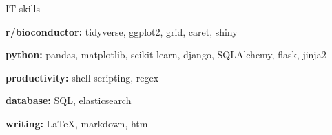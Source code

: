 

\begin{cvskills}
  \cvskill
    {IT skills} %
    {
      \begin{cvitems}
        \item {\textbf{r/bioconductor:} tidyverse, ggplot2, grid, caret, shiny}
        \item {\textbf{python:} pandas, matplotlib, scikit-learn, django, SQLAlchemy, flask, jinja2}
        \item {\textbf{productivity:} shell scripting, regex}
        \item {\textbf{database:} SQL, elasticsearch}
        \item {\textbf{writing:} LaTeX, markdown, html}
      \end{cvitems}
      }
      

\end{cvskills}
